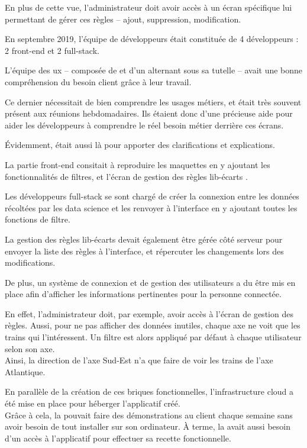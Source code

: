 En plus de cette vue, l'administrateur doit avoir accès à un écran spécifique lui permettant de gérer ces règles -- ajout, suppression, modification.

En septembre 2019, l'équipe de développeurs était constituée de 4 développeurs : 2 \gls{front-end} et 2 \gls{full-stack}.

L'équipe des \gls{ux} -- composée de \stefan et d'un alternant sous sa tutelle -- avait une bonne compréhension du besoin client grâce à leur travail.

Ce dernier nécessitait de bien comprendre les usages métiers, et \stefan était très souvent présent aux réunions hebdomadaires. Ils étaient donc d'une précieuse aide pour aider les développeurs à comprendre le réel besoin métier derrière ces écrans.

Évidemment, \damien était aussi là pour apporter des clarifications et explications.


La partie \gls{front-end} consitait à reproduire les maquettes en y ajoutant les fonctionnalités de filtres, et l'écran de gestion des règles \og lib-écarts \fg.


Les développeurs \gls{full-stack} se sont chargé de créer la connexion entre les données récoltées par les data science et les renvoyer à l'interface en y ajoutant toutes les fonctions de filtre.

La gestion des règles lib-écarts devait également être gérée côté serveur pour envoyer la liste des règles à l'interface, et répercuter les changements lors des modifications.


De plus, un système de connexion et de gestion des utilisateurs a du être mis en place afin d'afficher les informations pertinentes pour la personne connectée.

En effet, l'administrateur doit, par exemple, avoir accès à l'écran de gestion des règles. Aussi, pour ne pas afficher des données inutiles, chaque axe ne  voit que les trains qui l'intéressent. Un filtre est alors appliqué par défaut à chaque utilisateur selon son axe.\\
Ainsi, la direction de l'axe Sud-Est n'a que faire de voir les trains de l'axe Atlantique.


En parallèle de la création de ces briques fonctionnelles, l'infrastructure cloud a été mise en place pour héberger l'applicatif créé.\\
Grâce à cela, la \df pouvait faire des démonstrations au client chaque semaine sans avoir besoin de tout installer sur son ordinateur. À terme, la \sncf avait aussi besoin d'un accès à l'applicatif pour effectuer sa recette fonctionnelle.

